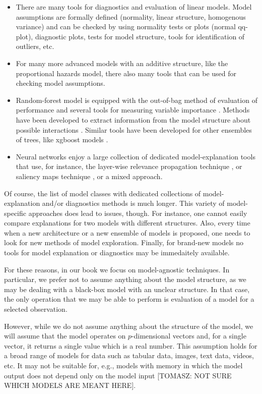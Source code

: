 \documentclass[12pt,]{krantz}
\providecommand{\tightlist}{%
  \setlength{\itemsep}{0pt}\setlength{\parskip}{0pt}}
\theoremstyle{definition}
\theoremstyle{definition}
\theoremstyle{definition}
\theoremstyle{remark}
\begin{document}
\begin{itemize}
\tightlist
\item
  There are many tools for diagnostics and evaluation of linear models.
  Model assumptions are formally defined (normality, linear structure,
  homogenous variance) and can be checked by using normality tests or
  plots (normal qq-plot), diagnostic plots, tests for model structure,
  tools for identification of outliers, etc.
\item
  For many more advanced models with an additive structure, like the
  proportional hazards model, there also many tools that can be used for
  checking model assumptions.
\item
  Random-forest model is equipped with the out-of-bag method of
  evaluation of performance and several tools for measuring variable
  importance \citep{R-randomForest}. Methods have been developed to
  extract information from the model structure about possible
  interactions \citep{R-randomForestExplainer}. Similar tools have been
  developed for other ensembles of trees, like xgboost models
  \citep{R-xgboostExplainer}.
\item
  Neural networks enjoy a large collection of dedicated
  model-explanation tools that use, for instance, the layer-wise
  relevance propagation technique \citep{BachLWRP}, or saliency maps
  technique \citep{SaliencyMaps}, or a mixed approach.
\end{itemize}

Of course, the list of model classes with dedicated collections of
model-explanation and/or diagnostics methods is much longer. This
variety of model-specific approaches does lead to issues, though. For
instance, one cannot easily compare explanations for two models with
different structures. Also, every time when a new architecture or a new
ensemble of models is proposed, one needs to look for new methods of
model exploration. Finally, for brand-new models no tools for model
explanation or diagnostics may be immedaitely available.

For these reasons, in our book we focus on model-agnostic techniques. In
particular, we prefer not to assume anything about the model structure,
as we may be dealing with a black-box model with an unclear structure.
In that case, the only operation that we may be able to perform is
evaluation of a model for a selected observation.

However, while we do not assume anything about the structure of the
model, we will assume that the model operates on \(p\)-dimensional
vectors and, for a single vector, it returns a single value which is a
real number. This assumption holds for a broad range of models for data
such as tabular data, images, text data, videos, etc. It may not be
suitable for, e.g., models with memory in which the model output does
not depend only on the model input {[}TOMASZ: NOT SURE WHICH MODELS ARE
MEANT HERE{]}.
\end{document}

